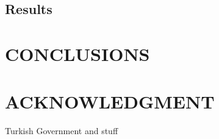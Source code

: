 \documentclass[letterpaper, 10 pt, conference]{ieeeconf}  %
\newcommand{\lorem}{
}
\begin{document}
  \subsection{Results}
  \lorem{}
  \lorem{}

\section{\label{sec-CO}CONCLUSIONS}
  \lorem{}

\addtolength{\textheight}{-12cm}   %


\section*{ACKNOWLEDGMENT}
Turkish Government and stuff



\end{document}
